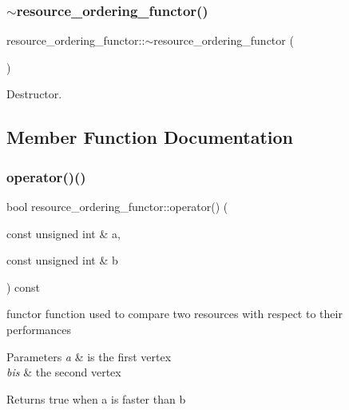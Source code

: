 \subsubsection{\texorpdfstring{$\sim$resource\+\_\+ordering\+\_\+functor()}{~resource\_ordering\_functor()}}
{\footnotesize\ttfamily resource\+\_\+ordering\+\_\+functor\+::$\sim$resource\+\_\+ordering\+\_\+functor (\begin{DoxyParamCaption}{ }\end{DoxyParamCaption})\hspace{0.3cm}{\ttfamily [default]}}



Destructor. 



\subsection{Member Function Documentation}
\mbox{\label{structresource__ordering__functor_a2a3ad6ccd7fc19d0b26caacb0d78991f}} 
\subsubsection{\texorpdfstring{operator()()}{operator()()}}
{\footnotesize\ttfamily bool resource\+\_\+ordering\+\_\+functor\+::operator() (\begin{DoxyParamCaption}\item[{const unsigned int \&}]{a,  }\item[{const unsigned int \&}]{b }\end{DoxyParamCaption}) const\hspace{0.3cm}{\ttfamily [inline]}}



functor function used to compare two resources with respect to their performances 


\begin{DoxyParams}{Parameters}
{\em a} & is the first vertex \\
\hline
{\em bis} & the second vertex \\
\hline
\end{DoxyParams}
\begin{DoxyReturn}{Returns}
true when a is faster than b 
\end{DoxyReturn}


